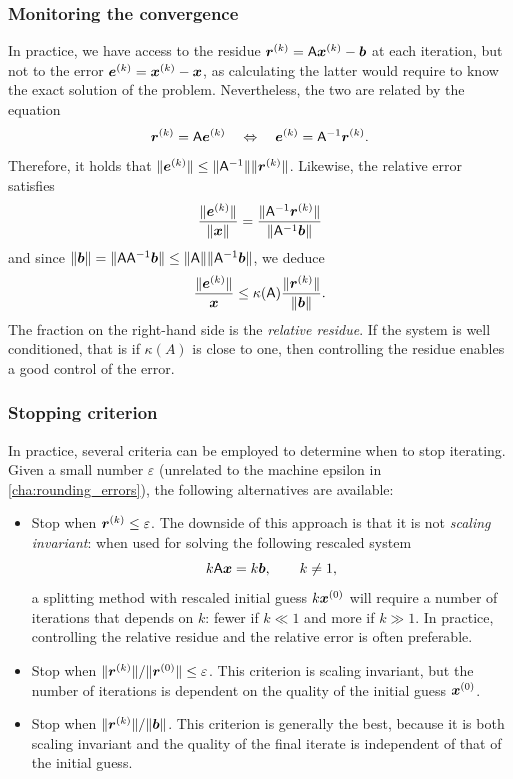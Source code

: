 \subsubsection{Monitoring the convergence}
\label{ssub:monitoring_the_convergence}
In practice,
we have access to the residue $\mathbf{\boldsymbol{r}}^{(k)} = \mathsf A \mathbf{\boldsymbol{x}}^{(k)} - \mathbf{\boldsymbol{b}}$ at each iteration,
but not to the error $\mathbf{\boldsymbol{e}}^{(k)} = \mathbf{\boldsymbol{x}}^{(k)} - \mathbf{\boldsymbol{x}}$,
as calculating the latter would require to know the exact solution of the problem.
Nevertheless,
the two are related by the equation
\[
    \mathbf{\boldsymbol{r}}^{(k)} = \mathsf A \mathbf{\boldsymbol{e}}^{(k)}
    \quad \Leftrightarrow \quad \mathbf{\boldsymbol{e}}^{(k)} = \mathsf A^{-1} \mathbf{\boldsymbol{r}}^{(k)}.
\]
Therefore, it holds that $\lVert\mathbf{\boldsymbol{e}}^{(k)}\rVert \leq \lVert\mathsf A^{-1}\rVert \lVert\mathbf{\boldsymbol{r}}^{(k)}\rVert$.
Likewise, the relative error satisfies
\[
     \frac{\lVert\mathbf{\boldsymbol{e}}^{(k)}\rVert}{\lVert\mathbf{\boldsymbol{x}}\rVert}
     = \frac{\lVert\mathsf A^{-1} \mathbf{\boldsymbol{r}}^{(k)}\rVert}{\lVert\mathsf A^{-1} \mathbf{\boldsymbol{b}}\rVert}
\]
and since $\lVert\mathbf{\boldsymbol{b}}\rVert = \lVert\mathsf A \mathsf A^{-1} \mathbf{\boldsymbol{b}}\rVert \leq \lVert\mathsf A\rVert \lVert\mathsf A^{-1} \mathbf{\boldsymbol{b}}\rVert$,
we deduce
\[
     \frac{\lVert\mathbf{\boldsymbol{e}}^{(k)}\rVert}{\mathbf{\boldsymbol{x}}}
     \leq \kappa(\mathsf A) \frac{\lVert\mathbf{\boldsymbol{r}}^{(k)}\rVert}{\lVert\mathbf{\boldsymbol{b}}\rVert}.
\]
The fraction on the right-hand side is the \emph{relative residue}.
If the system is well conditioned,
that is if $\kappa(A)$ is close to one,
then controlling the residue enables a good control of the error.

\subsubsection{Stopping criterion}%
\label{ssub:stopping_criterion}

In practice,
several criteria can be employed to determine when to stop iterating.
Given a small number $\varepsilon$ (unrelated to the machine epsilon in \cref{cha:rounding_errors}),
the following alternatives are available:
\begin{itemize}
    \item
        Stop when $\mathbf{\boldsymbol{r}}^{(k)} \leq \varepsilon$.
        The downside of this approach is that
        it is not \emph{scaling invariant}:
        when used for solving the following rescaled system
        \[
            k \mathsf A \mathbf{\boldsymbol{x}} = k \mathbf{\boldsymbol{b}}, \qquad k \neq 1,
        \]
        a splitting method with rescaled initial guess $k \mathbf{\boldsymbol{x}}^{(0)}$
        will require a number of iterations that depends on $k$:
        fewer if $k \ll 1$ and more if $k \gg 1$.
        In practice, controlling the relative residue and the relative error is often preferable.

    \item
        Stop when $\lVert\mathbf{\boldsymbol{r}}^{(k)}\rVert / \lVert\mathbf{\boldsymbol{r}}^{(0)}\rVert \leq \varepsilon$.
        This criterion is scaling invariant,
        but the number of iterations is dependent on the quality of the initial guess $\mathbf{\boldsymbol{x}}^{(0)}$.

    \item
        Stop when $\lVert\mathbf{\boldsymbol{r}}^{(k)}\rVert / \lVert\mathbf{\boldsymbol{b}}\rVert$.
        This criterion is generally the best,
        because it is both scaling invariant and the quality of the final iterate is independent of that of the initial guess.
\end{itemize}

